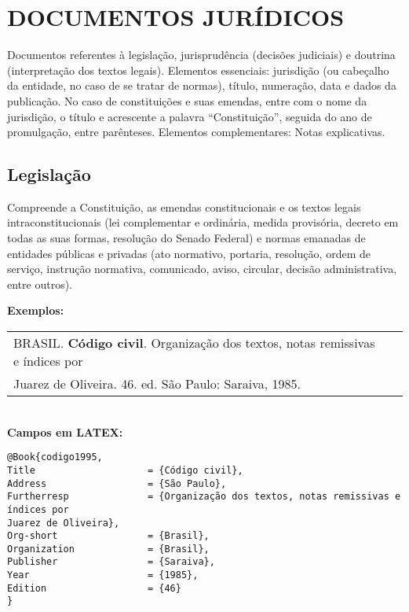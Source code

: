 \section{DOCUMENTOS JURÍDICOS}
	
Documentos referentes à legislação, jurisprudência (decisões judiciais) e
doutrina (interpretação dos textos legais).
Elementos essenciais: jurisdição (ou cabeçalho da entidade, no caso de
se tratar de normas), título, numeração, data e dados da publicação. No
caso de constituições e suas emendas, entre com o nome da jurisdição, o
título e acrescente a palavra “Constituição”, seguida do ano de
promulgação, entre parênteses.
Elementos complementares: Notas explicativas. \\
	
\subsection{Legislação}
	
Compreende a Constituição, as emendas constitucionais e os textos
legais intraconstitucionais (lei complementar e ordinária, medida
provisória, decreto em todas as suas formas, resolução do Senado
Federal) e normas emanadas de entidades públicas e privadas (ato
normativo, portaria, resolução, ordem de serviço, instrução normativa,
comunicado, aviso, circular, decisão administrativa, entre outros). 
	
\textbf{Exemplos:} \\
	
\begin{tabular}{|l|c|} \hline
	BRASIL. \textbf{Código civil}. Organização dos textos, notas remissivas e índices por \\Juarez de Oliveira. 46. ed. São Paulo: Saraiva, 1985. 
	                                                                                          \\\hline
\end{tabular} \\
	
\textbf{Campos em LATEX:} 
\begingroup
\fontsize{10pt}{12pt}\selectfont
\begin{verbatim}
@Book{codigo1995,
Title                    = {Código civil},
Address                  = {São Paulo},
Furtherresp              = {Organização dos textos, notas remissivas e 
índices por 
Juarez de Oliveira},
Org-short                = {Brasil},
Organization             = {Brasil},
Publisher                = {Saraiva},
Year                     = {1985},
Edition                  = {46}
}



\end{verbatim}
\endgroup
	
